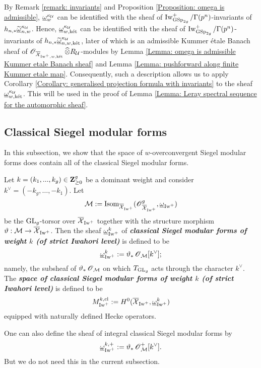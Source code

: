 By Remark \ref{remark: invariants} and Proposition \ref{Proposition: omega is admissible}, $\underline{\omega}^{\kappa_{\operatorname{\mathcal{U}}}}_w$ can be identified with the sheaf of $\operatorname{Iw}^+_{\operatorname{GSp}_{2g}}/\Gamma(p^n)$-invariants of $h_{n,*}\widetilde{\underline{\omega}}_{n,w}^{\kappa_{\operatorname{\mathcal{U}}}}$. Hence, $\underline{\omega}^{\kappa_{\operatorname{\mathcal{U}}}}_{w,\operatorname{\textrm{k\'{e}t}}}$ can be identified with the sheaf of $\operatorname{Iw}^+_{\operatorname{GSp}_{2g}}/\Gamma(p^n)$-invariants of $h_{n,*}\widetilde{\underline{\omega}}_{n,w, \operatorname{\textrm{k\'{e}t}}}^{\kappa_{\operatorname{\mathcal{U}}}}$, later of which is an admissible Kummer \'etale Banach sheaf of $\operatorname{\mathscr{O}}_{\overline{\operatorname{\mathcal{X}}}_{\operatorname{Iw}^+,w,\operatorname{\textrm{k\'{e}t}}}}\widehat{\otimes}R_{\operatorname{\mathcal{U}}}$-modules by Lemma \ref{Lemma: omega is admissible Kummer etale Banach sheaf} and Lemma \ref{Lemma: pushforward along finite Kummer etale map}. Consequently, such a description allows us to apply Corollary \ref{Corollary: generalised projection formula with invariants} to the sheaf $\underline{\omega}^{\kappa_{\operatorname{\mathcal{U}}}}_{w,\operatorname{\textrm{k\'{e}t}}}$. This will be used in the proof of Lemma \ref{Lemma: Leray spectral sequence for the automorphic sheaf}.


\subsection{Classical Siegel modular forms}\label{subsection: classical forms}
In this subsection, we show that the space of $w$-overconvergent Siegel modular forms does contain all of the classical Siegel modular forms.

Let $k = (k_1, ..., k_g)\in \operatorname{\mathbf{Z}}_{\geq 0}^g$ be a dominant weight and consider $k^{\vee}=(-k_g, \ldots, -k_1)$. Let \[
    \operatorname{\mathcal{M}}:= \operatorname{Isom}_{\overline{\operatorname{\mathcal{X}}}_{\operatorname{Iw}^+}}(\operatorname{\mathscr{O}}^g_{\overline{\operatorname{\mathcal{X}}}_{\operatorname{Iw}^+}}, \underline{\omega}_{\operatorname{Iw}^+})
\]be the $\operatorname{GL}_g$-torsor over $\overline{\operatorname{\mathcal{X}}}_{\operatorname{Iw}^+}$ together with the structure morphism $\vartheta: \operatorname{\mathcal{M}} \rightarrow \overline{\operatorname{\mathcal{X}}}_{\operatorname{Iw}^+}$. Then the sheaf $\underline{\omega}_{\operatorname{Iw}^+}^{k}$ of \textit{\textbf{classical Siegel modular forms of weight $k$ (of strict Iwahori level)}} is defined to be 
\[
    \underline{\omega}_{\operatorname{Iw}^+}^k := \vartheta_*\operatorname{\mathscr{O}}_{\operatorname{\mathcal{M}}}[k^{\vee}];
\] 
namely, the subsheaf of $\vartheta_*\operatorname{\mathscr{O}}_{\operatorname{\mathcal{M}}}$ on which $T_{\operatorname{GL}_g}$ acts through the character $k^{\vee}$. The \textit{\textbf{space of classical Siegel modular forms of weight $k$ (of strict Iwahori level)}} is defined to be
$$M^{k, \mathrm{cl}}_{\operatorname{Iw}^+}:=H^0(\overline{\operatorname{\mathcal{X}}}_{\operatorname{Iw}^+}, \underline{\omega}_{\operatorname{Iw}^+}^k)$$
equipped with naturally defined Hecke operators.

\begin{Remark}\label{Remark: integral classical sheaf}
\normalfont One can also define the sheaf of integral classical Siegel modular forms by
$$\underline{\omega}_{\operatorname{Iw}^+}^{k,+} := \vartheta_*\operatorname{\mathscr{O}}^+_{\operatorname{\mathcal{M}}}[k^{\vee}].$$
But we do not need this in the current subsection.
\end{Remark}

